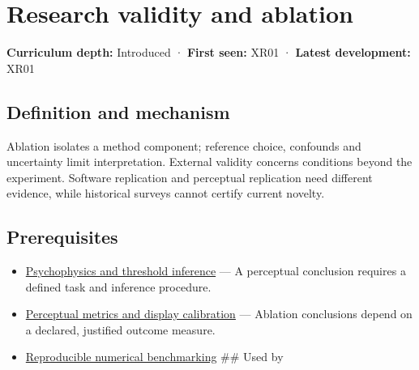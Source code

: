 \hypertarget{appendix-65788587ef78}{}\label{referencestart:appendix-65788587ef78}
\section{Research validity and ablation}\label{appendix-65788587ef78-research-validity-and-ablation}

\hypertarget{appendix-65788587ef78-research-validity-and-ablation}{}

\textbf{Curriculum depth:} Introduced · \textbf{First seen:} XR01 · \textbf{Latest development:} XR01

\begin{allmightroledefinition}

\subsection{Definition and mechanism}\label{appendix-65788587ef78-definition-and-mechanism}

\hypertarget{appendix-65788587ef78-definition-and-mechanism}{}

Ablation isolates a method component; reference choice, confounds and uncertainty limit interpretation. External validity concerns conditions beyond the experiment. Software replication and perceptual replication need different evidence, while historical surveys cannot certify current novelty.

\end{allmightroledefinition}

\subsection{Prerequisites}\label{appendix-65788587ef78-prerequisites}

\hypertarget{appendix-65788587ef78-prerequisites}{}

\begin{itemize}
\item
  \hyperref[appendix-1759f03e8ce7]{Psychophysics and threshold inference} --- A perceptual conclusion requires a defined task and inference procedure.
\item
  \hyperref[appendix-b2c1846508bf]{Perceptual metrics and display calibration} --- Ablation conclusions depend on a declared, justified outcome measure.
\item
  \hyperref[appendix-b9db93e28371]{Reproducible numerical benchmarking} \#\# Used by
\end{itemize}


